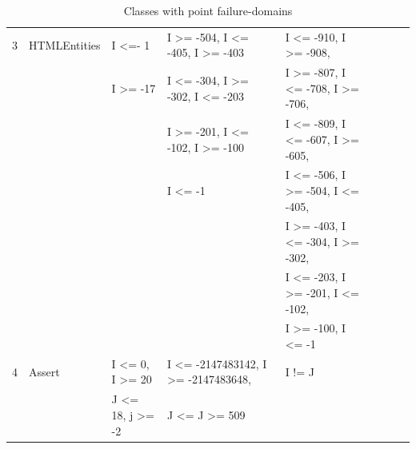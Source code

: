 \documentclass[runningheads,a4paper]{llncs}
\begin{document}
\begin{table}[h]
{{\begin{tabular}{|l|l|l|l|l|l|l|l|l|}
3	& HTMLEntities	&  	I \textless=- 1						& I \textgreater= -504, I \textless= -405, I \textgreater= -403		&  I \textless= -910, I \textgreater= -908,    									\\ 
	&                         & 	I \textgreater= -17					& I \textless= -304, I \textgreater= -302, I \textless= -203			&  I \textgreater= -807, I \textless= -708, I \textgreater= -706,  				 \\	
	&                         & 										& I \textgreater= -201, I \textless= -102, I \textgreater= -100		&  I \textless= -809, I \textless= -607, I \textgreater= -605,					 \\	
	&                         & 										& I \textless= -1													&  I \textless= -506, I \textgreater= -504, I \textless= -405,					 \\	
	&                         & 										& 																&  I \textgreater= -403, I \textless= -304, I \textgreater= -302,					 \\	
	&                         & 										& 																&  I \textless= -203, I \textgreater= -201, I \textless= -102,					  \\	
	&                         & 										& 																&  I \textgreater= -100, I \textless= -1			   		  					  \\
	
			
4	& Assert			&	I \textless= 0, I \textgreater= 20		& I \textless=  -2147483142, I \textgreater= -2147483648, 	 	&  I != J																		  \\
	&                         & 	J \textless= 18, j \textgreater= -2		& J \textless=  J \textgreater= 509									&  			   																  \\

\hline
\end{tabular}
}
}
\bigskip
\caption{Classes with point failure-domains}
\label{table:pointDomains}
\end{table}
\end{document}
